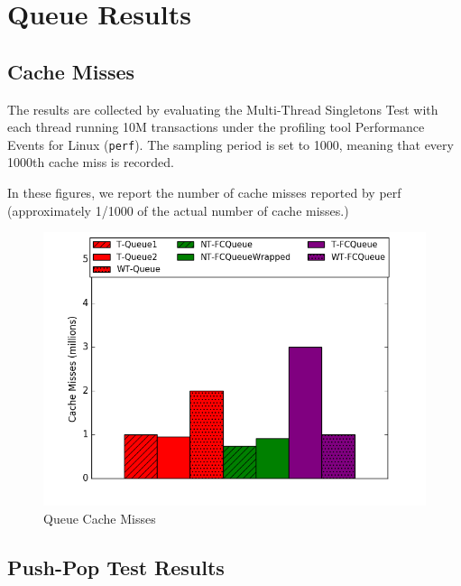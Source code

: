 \chapter{Queue Results}

\section{Cache Misses}

The results are collected by evaluating the Multi-Thread Singletons Test with each thread running 10M transactions under the profiling tool Performance Events for Linux (\texttt{perf}). The sampling period is set to 1000, meaning that every 1000th cache miss is recorded.

In these figures, we report the number of cache misses reported by perf (approximately 1/1000 of the actual number of cache misses.)

\begin{figure}[H]
    \centering
    \includegraphics[width=\textwidth]{fcqueues/cm.png}
    \caption{Queue Cache Misses}
\label{fig:cm_queues}
\end{figure}

\section{Push-Pop Test Results}


